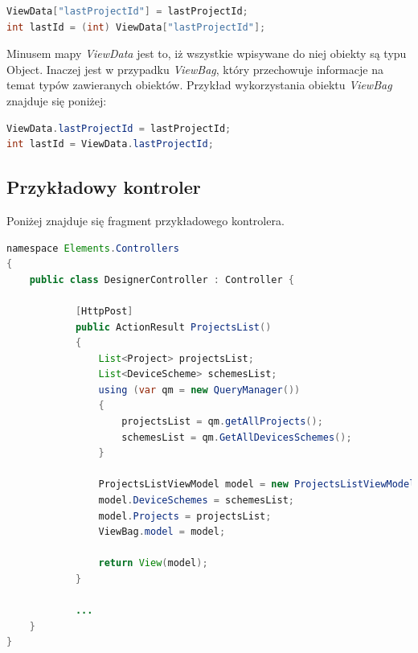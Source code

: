 \begin{lstlisting}[language=Java]
ViewData["lastProjectId"] = lastProjectId;
int lastId = (int) ViewData["lastProjectId"];
\end{lstlisting}
Minusem mapy \textit{ViewData} jest to, iż wszystkie wpisywane do niej obiekty są typu Object.
Inaczej jest w przypadku \textit{ViewBag}, który przechowuje informacje na temat typów zawieranych obiektów. Przykład wykorzystania obiektu \textit{ViewBag} znajduje się poniżej:
\begin{lstlisting}[language=Java]
ViewData.lastProjectId = lastProjectId;
int lastId = ViewData.lastProjectId;
\end{lstlisting}

\subsection{Przykładowy kontroler}
Poniżej znajduje się fragment przykładowego kontrolera.


\begin{lstlisting}[language=Java]
namespace Elements.Controllers
{
    public class DesignerController : Controller {
    
            [HttpPost]
            public ActionResult ProjectsList()
            {
                List<Project> projectsList;
                List<DeviceScheme> schemesList;
                using (var qm = new QueryManager())
                {
                    projectsList = qm.getAllProjects();
                    schemesList = qm.GetAllDevicesSchemes();
                }
                
                ProjectsListViewModel model = new ProjectsListViewModel();
                model.DeviceSchemes = schemesList;
                model.Projects = projectsList;
    			ViewBag.model = model;
    			
                return View(model);
            }
            
            ...     
    }
}
\end{lstlisting}


